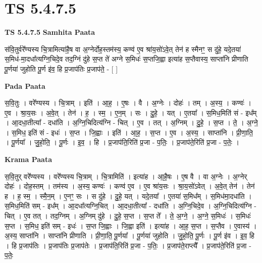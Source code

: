 \documentclass[17pt]{extarticle}
\begin{document}
\section{ TS 5.4.7.5 }

\textbf{TS 5.4.7.5 } \newline
\textbf{Samhita Paata} \newline

स॑वि॒तुर्वरे᳚ण्यस्य चि॒त्रामित्या॑है॒ष वा अ॒ग्नेर्दोह॒स्तम॑स्य॒ कण्व॑ ए॒व श्रा॑य॒सो॑ऽवे॒त् तेन॑ ह स्मैनꣳ॒॒ स दु॑हे॒ यदे॒तया॑ स॒मिध॑-मा॒दधा᳚त्यग्नि॒चिदे॒व तद॒ग्निं दु॑हे स॒प्त ते॑ अग्ने स॒मिधः॑ स॒प्तजि॒ह्वा इत्या॑ह स॒प्तैवास्य॒ साप्ता॑नि प्रीणाति पू॒र्णया॑ जुहोति पू॒र्ण इ॑व॒ हि प्र॒जाप॑तिः प्र॒जाप॑ते॒ - [  ] \newline

\textbf{Pada Paata} \newline

स॒वि॒तुः । वरे᳚ण्यस्य । चि॒त्राम् । इति॑ । आ॒ह॒ । ए॒षः । वै । अ॒ग्नेः । दोहः॑ । तम् । अ॒स्य॒ । कण्वः॑ । ए॒व । श्रा॒य॒सः । अ॒वे॒त् । तेन॑ । ह॒ । स्म॒ । ए॒न॒म् । सः । दु॒हे॒ । यत् । ए॒तया᳚ । स॒मिध॒मिति॑ सं - इध᳚म् । आ॒दधा॒तीत्या᳚ - दधा॑ति । अ॒ग्नि॒चिदित्य॑ग्नि - चित् । ए॒व । तत् । अ॒ग्निम् । दु॒हे॒ । स॒प्त । ते॒ । अ॒ग्ने॒ । स॒मिध॒ इति॑ सं - इधः॑ । स॒प्त । जि॒ह्वाः । इति॑ । आ॒ह॒ । स॒प्त । ए॒व । अ॒स्य॒ । साप्ता॑नि । प्री॒णा॒ति॒ । पू॒र्णया᳚ । जु॒हो॒ति॒ । पू॒र्णः । इ॒व॒ । हि । प्र॒जाप॑ति॒रिति॑ प्र॒जा - प॒तिः॒ । प्र॒जाप॑ते॒रिति॑ प्र॒जा - प॒तेः॒ ।  \newline


\textbf{Krama Paata} \newline

स॒वि॒तुर् वरे᳚ण्यस्य । वरे᳚ण्यस्य चि॒त्राम् । चि॒त्रामिति॑ । इत्या॑ह । आ॒है॒षः । ए॒ष वै । वा अ॒ग्नेः । अ॒ग्नेर् दोहः॑ । दोह॒स्तम् । तम॑स्य । अ॒स्य॒ कण्वः॑ । कण्व॑ ए॒व । ए॒व श्रा॑य॒सः । श्रा॒य॒सो॑ऽवेत् । अ॒वे॒त् तेन॑ । तेन॑ ह । ह॒ स्म॒ । स्मै॒न॒म् । ए॒नꣳ॒॒ सः । स दु॑हे । दु॒हे॒ यत् । यदे॒तया᳚ । ए॒तया॑ स॒मिध᳚म् । स॒मिध॑मा॒दधा॑ति । स॒मिध॒मिति॑ सम् - इध᳚म् । आ॒दधा᳚त्यग्नि॒चित् । आ॒दधा॒तीत्या᳚ - दधा॑ति । अ॒ग्नि॒चिदे॒व । अ॒ग्नि॒चिदित्य॑ग्नि - चित् । ए॒व तत् । तद॒ग्निम् । अ॒ग्निम् दु॑हे । दु॒हे॒ स॒प्त । स॒प्त ते᳚ । ते॒ अ॒ग्ने॒ । अ॒ग्ने॒ स॒मिधः॑ । स॒मिधः॑ स॒प्त । स॒मिध॒ इति॑ सम् - इधः॑ । स॒प्त जि॒ह्वाः । जि॒ह्वा इति॑ । इत्या॑ह । आ॒ह॒ स॒प्त । स॒प्तैव । ए॒वास्य॑ । अ॒स्य॒ साप्ता॑नि । साप्ता॑नि प्रीणाति । प्री॒णा॒ति॒ पू॒र्णया᳚ । पू॒र्णया॑ जुहोति । जु॒हो॒ति॒ पू॒र्णः । पू॒र्ण इ॑व । इ॒व॒ हि । हि प्र॒जाप॑तिः । प्र॒जाप॑तिः प्र॒जाप॑तेः । प्र॒जाप॑ति॒रिति॑ प्र॒जा - प॒तिः॒ । प्र॒जाप॑ते॒राप्त्यै᳚ । प्र॒जाप॑ते॒रिति॑ प्र॒जा - प॒तेः॒ \newline
\end{document}
